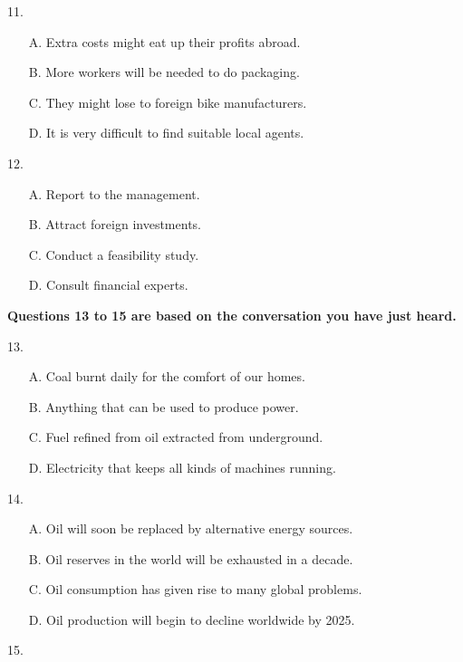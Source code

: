 \documentclass[UTF8,11pt]{ctexart}
\begin{document}
11.


\begin{itemize}[leftmargin=2em,itemsep=.2em,topsep=.4em]\item[A.] Extra costs might eat up their profits abroad.
\item[B.] More workers will be needed to do packaging.
\item[C.] They might lose to foreign bike manufacturers.
\item[D.] It is very difficult to find suitable local agents.
\end{itemize}

12.


\begin{itemize}[leftmargin=2em,itemsep=.2em,topsep=.4em]\item[A.] Report to the management.
\item[B.] Attract foreign investments.
\item[C.] Conduct a feasibility study.
\item[D.] Consult financial experts.
\end{itemize}

\textbf{Questions 13 to 15 are based on the conversation you have just heard.}


13.


\begin{itemize}[leftmargin=2em,itemsep=.2em,topsep=.4em]\item[A.] Coal burnt daily for the comfort of our homes.
\item[B.] Anything that can be used to produce power.
\item[C.] Fuel refined from oil extracted from underground.
\item[D.] Electricity that keeps all kinds of machines running.
\end{itemize}

14.


\begin{itemize}[leftmargin=2em,itemsep=.2em,topsep=.4em]\item[A.] Oil will soon be replaced by alternative energy sources.
\item[B.] Oil reserves in the world will be exhausted in a decade.
\item[C.] Oil consumption has given rise to many global problems.
\item[D.] Oil production will begin to decline worldwide by 2025.
\end{itemize}

15.
\end{document}
